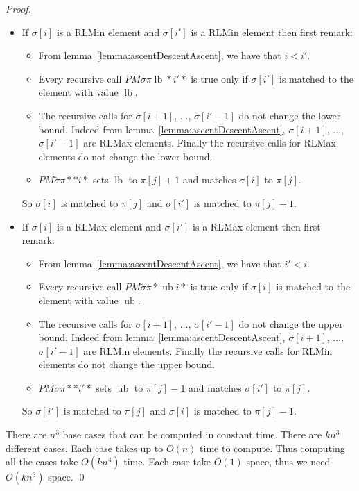\documentclass[a4paper]{llncs}
\newcommand{\ptext}{\pi}
\newcommand{\ppattern}{\sigma}
\newcommand{\PM}{PM}
\DeclareMathOperator{\lb}{lb}
\DeclareMathOperator{\ub}{ub}
\begin{document}
\begin{proof}
\begin{itemize}
\begin{itemize}
			\item If $\ppattern[i]$ is a RLMin element and $\ppattern[i']$ is a RLMin element then
			first remark:
			\begin{itemize}

				\item From lemma~\ref{lemma:ascentDescentAscent},
				we have that $i<i'$.

				\item  Every recursive call $\PM{\widetilde{\sigma}}{\ptext}{\lb}{*}{i'}{*}$ is true only if $\sigma[i']$ is matched to the element with value $\lb$.

				\item  The recursive calls for $\sigma[i+1]$, $\ldots$, $\sigma[i'-1]$ do not change the lower bound. Indeed
				from lemma~\ref{lemma:ascentDescentAscent}, $\sigma[i+1]$,  $\ldots$, $\sigma[i'-1]$ are RLMax elements. Finally the recursive calls for RLMax elements do not change the lower bound.

				\item $\PM{\widetilde{\sigma}}{\ptext}{*}{*}{i}{*}$ sets $\lb$ to $\ptext[j]+1$ and matches $\sigma[i]$ to $\ptext[j]$.

			\end{itemize}
			So $\sigma[i]$ is matched to $\ptext[j]$ and
			$\sigma[i']$ is matched to $\ptext[j]+1$.


			\item If $\ppattern[i]$ is a RLMax element and $\ppattern[i']$ is a RLMax element then
			first remark:
			\begin{itemize}
				\item From lemma~\ref{lemma:ascentDescentAscent},
				we have that $i'<i$.

				\item  Every recursive call $\PM{\widetilde{\sigma}}{\ptext}{*}{\ub}{i}{*}$ is true only if $\sigma[i]$ is matched to the element with value $\ub$.

				\item  The recursive calls for $\sigma[i+1]$, $\ldots$, $\sigma[i'-1]$ do not change the upper bound. Indeed
				from lemma~\ref{lemma:ascentDescentAscent}, $\sigma[i+1]$,  $\ldots$, $\sigma[i'-1]$ are RLMin elements. Finally the recursive calls for RLMin elements do not change the upper bound.

				\item $\PM{\widetilde{\sigma}}{\ptext}{*}{*}{i'}{*}$ sets $\ub$ to $\ptext[j]-1$ and matches $\sigma[i']$ to $\ptext[j]$.

			\end{itemize}
			So $\sigma[i']$ is matched to $\ptext[j]$ and
			$\sigma[i]$ is matched to $\ptext[j]-1$.


		\end{itemize}
\end{itemize}

There are $n^3$ base cases that can be computed in constant time.
There are $kn^3$ different cases. Each case takes up to $O(n)$ time to compute.
Thus computing all the cases take $O(kn^4)$ time.
Each case take $O(1)$ space, thus we need $O(kn^3)$ space.
\qed
\end{proof}
\end{document}
